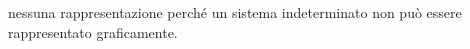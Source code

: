nessuna rappresentazione perché un sistema 
indeterminato non può essere rappresentato 
graficamente.
